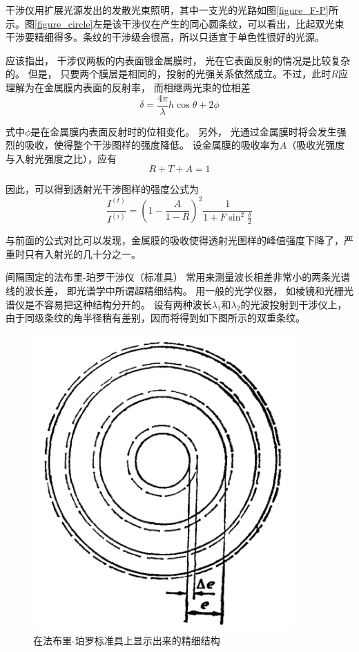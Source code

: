 \documentclass[UTF8]{ctexart}
\begin{document}
	干涉仪用扩展光源发出的发散光束照明，其中一支光的光路如图\ref{figure_F-P}所示。图\ref{figure_circle}左是该干涉仪在产生的同心圆条纹，可以看出，比起双光束干涉要精细得多。条纹的干涉级会很高，所以只适宜于单色性很好的光源。

	应该指出， 干涉仪两板的内表面镀金属膜时， 光在它表面反射的情况是比较复杂的。 但是， 只要两个膜层是相同的，投射的光强关系依然成立。不过，此时$ R $应理解为在金属膜内表面的反射率， 而相继两光束的位相差
	\begin{equation}
	\delta=\frac{4 \pi}{\lambda} h \cos \theta+2 \phi \label{equ_delta_}
	\end{equation}
	
\noindent 式中$ \phi $是在金属膜内表面反射时的位相变化。 另外， 光通过金属膜时将会发生强烈的吸收，使得整个干涉图样的强度降低。 设金属膜的吸收率为$ A $（吸收光强度与入射光强度之比），应有
\begin{equation}
R+T+A=1
\end{equation}

\noindent 因此，可以得到透射光干涉图样的强度公式为
\begin{equation}
\frac{I^{(t)}}{I^{(i)}}=\left(1-\frac{A}{1-R}\right)^{2} \frac{1}{1+F \sin ^{2} \frac{\delta}{2}}
\end{equation}

\noindent  与前面的公式对比可以发现，金属膜的吸收使得透射光图样的峰值强度下降了，严重时只有入射光的几十分之一。

	间隔固定的法布里-珀罗干涉仪（标准具） 常用来测量波长相差非常小的两条光谱线的波长差， 即光谱学中所谓超精细结构。 用一般的光学仪器， 如棱镜和光栅光谱仪是不容易把这种结构分开的。 
	设有两种波长$ \lambda_{1} $和$ \lambda_{2} $的光波投射到干涉仪上，由于同级条纹的角半径稍有差别，因而将得到如下图所示的双重条纹。
	\begin{figure}[H]
		\centering
		\includegraphics[width=10cm]{Interference_light.png}
		\caption{在法布里-珀罗标准具上显示出来的精细结构}
		\label{figure_light}
	\end{figure}
\end{document}
